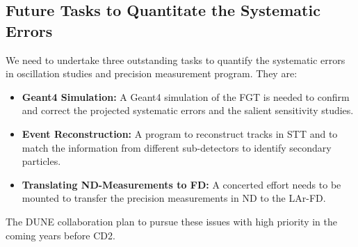 \subsection{Future Tasks to Quantitate the Systematic Errors}
\label{cdrsec:detectors-nd-ref-fgt-req-future} 

We need to undertake three outstanding tasks to quantify the systematic errors in oscillation studies 
and precision measurement program. They are: 
\begin{itemize}
    \item {\bf Geant4 Simulation:} A Geant4 simulation of the FGT is needed to confirm and correct 
    the projected systematic errors and  the salient sensitivity studies. 
    
     \item {\bf Event Reconstruction:} A program to reconstruct tracks in STT and to match the 
     information from different sub-detectors to identify secondary particles.  
     
     \item {\bf Translating ND-Measurements to FD:} A concerted effort needs to be mounted to transfer 
     the precision measurements in ND to the LAr-FD. 

\end{itemize}    

The DUNE collaboration plan to pursue these issues with high priority in the coming years before CD2. 
